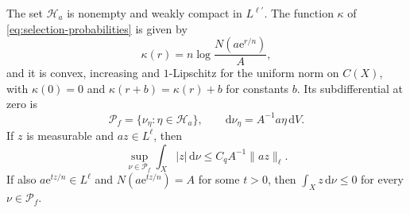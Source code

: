 \begin{proposition}\label{prop:selection-norming-probabilities}
The set $\mathcal H_a$ is nonempty and weakly compact in $L^{\ell'}$. The function $\kappa$ of \eqref{eq:selection-probabilities} is given by
\[
 \kappa(r)=n\log\frac{N(a\mathrm{e}^{r/n})}{A},
\]
and it is convex, increasing and $1$-Lipschitz for the uniform norm on $C(X)$, with $\kappa(0)=0$ and $\kappa(r+b)=\kappa(r)+b$ for constants $b$. Its subdifferential at zero is
\begin{equation}\label{eq:selection-face-representation}
 \mathcal P_f=\{\nu_\eta:\eta\in\mathcal H_a\},\qquad
 \mathrm{d}\nu_\eta=A^{-1}a\eta\,\mathrm{d}V.
\end{equation}
If $z$ is measurable and $az\in L^\ell$, then
\begin{equation}\label{eq:selection-weighted-moment}
 \sup_{\nu\in\mathcal P_f}\int_X|z|\,\mathrm{d}\nu
       \leq C_q A^{-1}\|az\|_\ell.
\end{equation}
If also $a\mathrm{e}^{tz/n}\in L^\ell$ and $N(a\mathrm{e}^{tz/n})=A$ for some $t>0$, then $\int_Xz\,\mathrm{d}\nu\leq0$ for every $\nu\in\mathcal P_f$.
\end{proposition}

